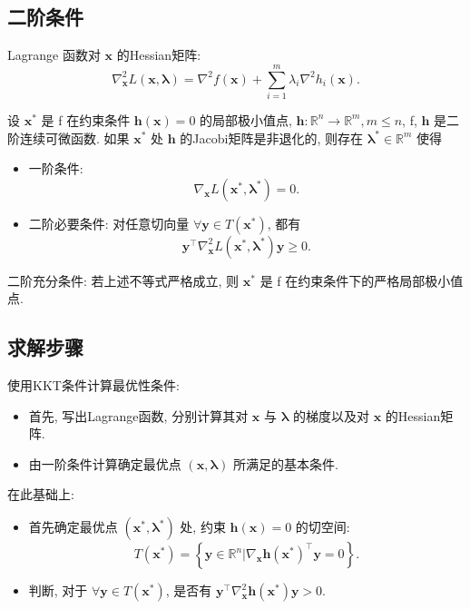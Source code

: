\documentclass[lang = cn]{elegantpaper}
\begin{document}
\subsection{二阶条件}
\noindent
Lagrange 函数对 $\bm{x}$ 的Hessian矩阵:
\begin{equation*}
    \nabla_{\bm{x}}^2 L(\bm{x},\bm{\lambda}) = \nabla^2 f(\bm{x}) + \sum_{i=1}^m \lambda_i \nabla^2 h_i(\bm{x}).
\end{equation*}
\begin{theorem}
    设 $\bm{x}^{*}$ 是 f 在约束条件 $\bm{h}(\bm{x})=0$ 的局部极小值点, $\bm{h}:\mathbb{R}^n \rightarrow \mathbb{R}^m,m \le n$, f, $\bm{h}$ 是二阶连续可微函数. 如果 $\bm{x}^{*}$ 处 $\bm{h}$ 的Jacobi矩阵是非退化的, 则存在 $\bm{\lambda}^{*} \in \mathbb{R}^m$ 使得
\begin{itemize}
    \item 一阶条件:
\begin{equation*}
    \nabla_{\bm{x}} L(\bm{x}^{*},\bm{\lambda}^{*}) = 0.
\end{equation*}
    \item 二阶必要条件: 对任意切向量 $\forall \bm{y} \in T(\bm{x}^{*})$, 都有
\begin{equation*}
    \bm{y}^\top \nabla_{\bm{x}}^2 L(\bm{x}^{*},\bm{\lambda}^{*})\bm{y} \ge 0.
\end{equation*}
    
\end{itemize}
\end{theorem}
\noindent
二阶充分条件: 若上述不等式严格成立, 则 $\bm{x}^{*}$ 是 f 在约束条件下的严格局部极小值点.
\subsection{求解步骤}
\noindent
使用KKT条件计算最优性条件:
\begin{itemize}
    \item 首先, 写出Lagrange函数, 分别计算其对 $\bm{x}$ 与 $\bm{\lambda}$ 的梯度以及对 $\bm{x}$ 的Hessian矩阵.
    \item 由一阶条件计算确定最优点 $(\bm{x},\bm{\lambda})$ 所满足的基本条件.
\end{itemize}
在此基础上:
\begin{itemize}
    \item 首先确定最优点 $(\bm{x}^{*},\bm{\lambda}^{*})$ 处, 约束 $\bm{h}(\bm{x}) = 0$ 的切空间:
\begin{equation*}
    T(\bm{x}^{*}) = \left\{\bm{y} \in \mathbb{R}^n|\nabla_{\bm{x}}\bm{h}(\bm{x}^{*})^\top \bm{y}=0\right\}.
\end{equation*}
    \item 判断, 对于 $\forall \bm{y} \in T(\bm{x}^{*})$, 是否有 $\bm{y}^\top \nabla_{\bm{x}}^2\bm{h}(\bm{x}^{*})\bm{y} > 0$.
\end{itemize}
\end{document}
